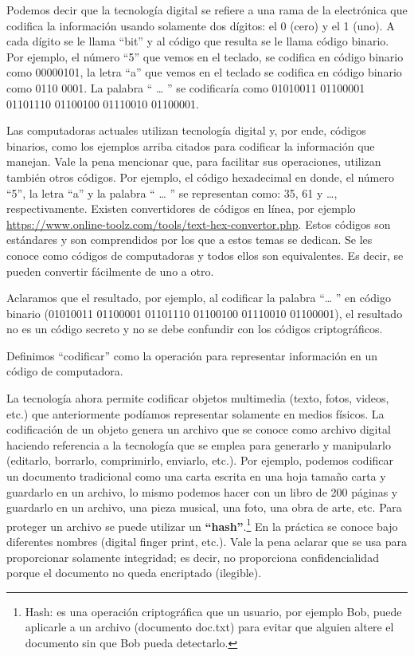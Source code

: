 \documentclass[12pt]{report} %
\begin{document}
Podemos decir que la tecnología digital se refiere a una rama de la electrónica que codifica la información usando solamente dos dígitos: el 0 (cero) y el 1 (uno).  A cada dígito se le llama “bit” y al código que resulta se le llama código binario. Por ejemplo, el número “5” que vemos en el teclado, se codifica en código binario como 00000101, la letra “a” que vemos en el teclado se codifica en código binario como 0110 0001. La palabra “ … ” se codificaría como 01010011 01100001 01101110 01100100 01110010 01100001.  

Las computadoras actuales utilizan tecnología digital y, por ende, códigos binarios, como los ejemplos arriba citados para codificar la información que manejan. Vale la pena mencionar que, para facilitar sus operaciones, utilizan también otros códigos. Por ejemplo, el código hexadecimal en donde, el número “5”, la letra “a” y la palabra “ … ” se representan como: 35, 61 y …, respectivamente.  Existen convertidores de códigos en línea, por ejemplo \url{https://www.online-toolz.com/tools/text-hex-convertor.php}. Estos códigos son estándares y son comprendidos por los que a estos temas se dedican. Se les conoce como códigos de computadoras y todos ellos son equivalentes. Es decir, se pueden convertir fácilmente de uno a otro.

Aclaramos que el resultado, por ejemplo, al codificar la palabra “… ” en código binario  (01010011 01100001 01101110 01100100 01110010 01100001), el resultado no es un código secreto y no se debe confundir con los códigos criptográficos.

Definimos “codificar” como la operación para representar información en un código de computadora.

La tecnología ahora permite codificar objetos multimedia (texto, fotos, videos, etc.) que anteriormente podíamos representar solamente en medios físicos. La codificación de un objeto genera un archivo que se conoce como archivo digital haciendo referencia a la tecnología que se emplea para generarlo y manipularlo (editarlo, borrarlo, comprimirlo, enviarlo, etc.). Por ejemplo, podemos codificar un documento tradicional como una carta escrita en una hoja tamaño carta y guardarlo en un archivo, lo mismo podemos hacer con un libro de 200 páginas y guardarlo en un archivo, una pieza musical, una foto, una obra de arte, etc. Para proteger un archivo se puede utilizar un \textbf{“hash”}.\footnote{Hash: es una operación criptográfica que un usuario, por ejemplo Bob, puede aplicarle a un archivo (documento doc.txt) para evitar que alguien altere el documento sin que Bob pueda detectarlo. }  En la práctica se conoce bajo diferentes nombres (digital finger print, etc.). Vale la pena aclarar que se usa para proporcionar solamente integridad; es decir, no proporciona confidencialidad porque el documento no queda encriptado (ilegible). 
\end{document}
